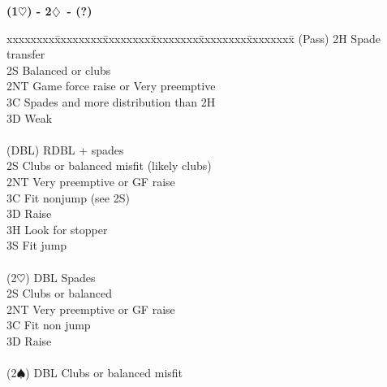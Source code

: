 \documentclass[10pt]{article}
\renewcommand{\d}{$\diamondsuit$}
\newcommand{\h}{$\heartsuit$}
\newcommand{\s}{$\spadesuit$}
\newcommand{\x}{DBL}
\newenvironment{bidtable}[1][]
{\textbf{#1}
  \begin{adjustwidth}{1em}{}
    \addvspace{2pt}
    \begin{tabbing}
      xxxxxxxx\=xxxxxxxx\=xxxxxxxx\=xxxxxxxx\=xxxxxxxx\=xxxxxxxx\=\kill}
{\end{tabbing}\end{adjustwidth}\bigskip}%
\begin{document}
\begin{multicols*}{2}
\begin{bidtable}[(1\h) - 2\d\ - (?)]
(Pass) \> 2H   \> Spade transfer                                              \\
       \> 2S   \> Balanced or clubs                                           \\
       \> 2NT  \> Game force raise or Very preemptive                         \\
       \> 3C   \> Spades and more distribution than 2H                        \\
       \> 3D   \> Weak                                                        \\
                                                                              \\
(\x)   \> RDBL + spades                                                   \\
       \> 2S   \> Clubs or balanced misfit (likely clubs)                     \\
       \> 2NT  \> Very preemptive or GF raise                                 \\
       \> 3C   \> Fit nonjump  (see 2S)                                       \\
       \> 3D   \> Raise                                                       \\
       \> 3H   \> Look for stopper                                            \\
       \> 3S   \> Fit jump                                                    \\
                                                                              \\
(2\h)  \> DBL  \> Spades                                                      \\
       \> 2S   \> Clubs or balanced                                           \\
       \> 2NT  \> Very preemptive or GF raise                                 \\
       \> 3C   \> Fit non jump                                                \\
       \> 3D   \> Raise                                                       \\
                                                                              \\
(2\s)  \> DBL  \> Clubs or balanced misfit                                    \\

\end{bidtable}
\end{multicols*}
\end{document}
